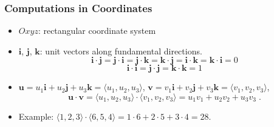 \begin{frame}
 \frametitle{Computations in Coordinates}

 \begin{itemize}
  \item  $Oxyz$: rectangular coordinate system

  \item $\textbf{i}$, $\textbf{j}$, $\textbf{k}$: unit vectors along fundamental directions.
%
$$ \textbf{i} \cdot \textbf{j} = \textbf{j} \cdot \textbf{i} = \textbf{j} \cdot \textbf{k}
 = \textbf{k} \cdot \textbf{j} = \textbf{i} \cdot \textbf{k} = \textbf{k} \cdot \textbf{i} = 0$$
%
$$\textbf{i} \cdot \textbf{i} = \textbf{j} \cdot \textbf{j} = \textbf{k} \cdot \textbf{k} = 1$$

  \item $\textbf{u} = u_1 \textbf{i} + u_2 \textbf{j} + u_3 \textbf{k} = \langle u_1, u_2, u_3 \rangle$,
 $\textbf{v}=v_1 \textbf{i} + v_2 \textbf{j} + v_3 \textbf{k} = \langle v_1, v_2, v_3 \rangle$,
%
$$\textbf{u} \cdot \textbf{v} = \langle u_1, u_2, u_3 \rangle \cdot \langle v_1, v_2, v_3 \rangle =
u_1v_1 + u_2 v_2 +u_3 v_3\; .$$

\item Example: $\langle 1,2,3 \rangle \cdot \langle 6,5,4 \rangle = 1 \cdot 6 + 2\cdot 5 + 3 \cdot 4 = 28$.
 \end{itemize}
\end{frame}
